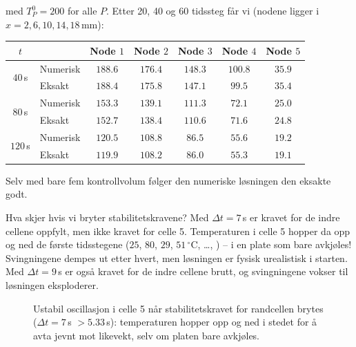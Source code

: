 med $T_P^0 = 200$ for alle $P$. Etter 20, 40 og 60 tidssteg får vi (nodene ligger i $x = 2, 6, 10, 14, 18\,$mm):
\begin{center}
\begin{tabular}{|c|l|c|c|c|c|c|}
\hline
$t$ & & Node $1$ & Node $2$ & Node $3$ & Node $4$ & Node $5$ \\
\hline
\multirow{2}{*}{$40\,$s} & Numerisk & $188.6$ & $176.4$ & $148.3$ & $100.8$ & $35.9$ \\
 & Eksakt & $188.4$ & $175.8$ & $147.1$ & $99.5$ & $35.4$ \\
\hline
\multirow{2}{*}{$80\,$s} & Numerisk & $153.3$ & $139.1$ & $111.3$ & $72.1$ & $25.0$ \\
 & Eksakt & $152.7$ & $138.4$ & $110.6$ & $71.6$ & $24.8$ \\
\hline
\multirow{2}{*}{$120\,$s} & Numerisk & $120.5$ & $108.8$ & $86.5$ & $55.6$ & $19.2$ \\
 & Eksakt & $119.9$ & $108.2$ & $86.0$ & $55.3$ & $19.1$ \\
\hline
\end{tabular}
\end{center}
Selv med bare fem kontrollvolum følger den numeriske løsningen den eksakte godt.

Hva skjer hvis vi bryter stabilitetskravene? Med $\Delta t = 7\,$s er kravet for de indre cellene oppfylt, men ikke kravet for celle 5. Temperaturen i celle 5 hopper da opp og ned de første tidsstegene ($25$, $80$, $29$, $51\,^\circ$C, \ldots, ) -- i en plate som bare avkjøles! Svingningene dempes ut etter hvert, men løsningen er fysisk urealistisk i starten. Med $\Delta t = 9\,$s er også kravet for de indre cellene brutt, og svingningene vokser til løsningen eksploderer.

\begin{figure}[htbp]\centering
{}
\caption{Ustabil oscillasjon i celle 5 når stabilitetskravet for randcellen brytes ($\Delta t=7\,$s $>5.33\,$s): temperaturen hopper opp og ned i stedet for å avta jevnt mot likevekt, selv om platen bare avkjøles.}\label{fig:stabilitet_plate}
\end{figure}

